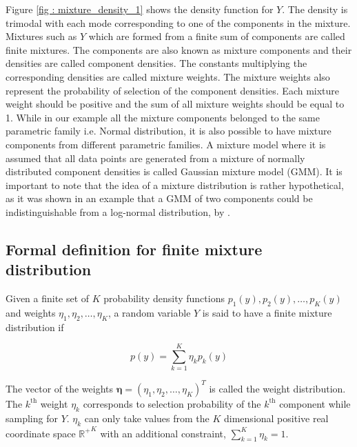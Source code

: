 Figure \ref{fig : mixture_density_1} shows the density function for $Y$. The density is trimodal with each mode corresponding to one of the components in the mixture. Mixtures such as $Y$ which are formed from a finite sum of components are called finite mixtures. The components are also known as mixture components and their densities are called component densities. The constants multiplying the corresponding densities are called mixture weights. The mixture weights also represent the probability of selection of the component densities. Each mixture weight should be positive and the sum of all mixture weights should be equal to 1. While in our example all the mixture components belonged to the same parametric family i.e. Normal distribution, it is also possible to have mixture components from different parametric families. A mixture model where it is assumed that all data points are generated from a mixture of normally distributed component densities is called Gaussian mixture model (GMM). It is important to note that the idea of a mixture distribution is rather hypothetical, as it was shown in an example that a GMM of two components could be indistinguishable from a log-normal distribution, by \citet{titterington_statistical_1986}.

\subsection{Formal definition for finite mixture distribution}
\label{subsec : formal_def_mixture_dist}
Given a finite set of $K$ probability density functions $p_1(y), p_2(y), \ldots, p_K(y)$ and weights $\eta_1, \eta_2, \ldots, \eta_K$, a random variable $Y$ is said to have a finite mixture distribution if

$$p(y) = \sum_{k=1}^{K} \eta_{k} p_{k}(y)$$

The vector of the weights $\boldsymbol{\eta} = (\eta_1, \eta_2, \ldots, \eta_K)^T$ is called the weight distribution. The $k^\text{th}$ weight $\eta_{k}$ corresponds to selection probability of the $k^\text{th}$ component while sampling for $Y$. $\eta_{k}$ can only take values from the $K$ dimensional positive real coordinate space ${\mathbb{R}^{+}}^K$ with an additional constraint, $\sum_{k=1}^{K} \eta_{k} = 1$.\\

